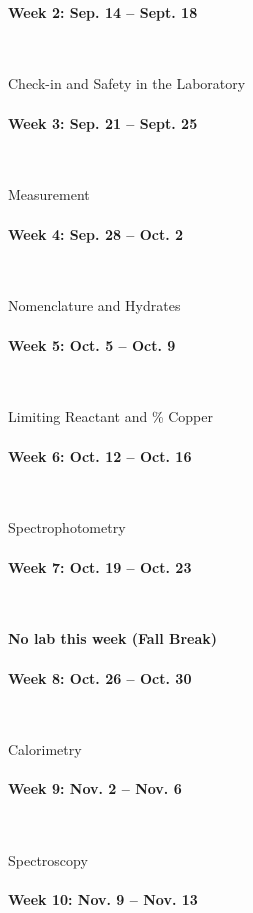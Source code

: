 \documentclass[12pt, letterpaper]{article}
\begin{document}
\paragraph{Week 2: Sep. 14 -- Sept. 18}~

Check-in and Safety in the Laboratory

\paragraph{Week 3: Sep. 21 -- Sept. 25}~

Measurement

\paragraph{Week 4: Sep. 28 -- Oct. 2}~

Nomenclature and Hydrates

\paragraph{Week 5: Oct. 5 -- Oct. 9}~

Limiting Reactant and \% Copper

\paragraph{Week 6: Oct. 12 -- Oct. 16}~

Spectrophotometry

\paragraph{Week 7: Oct. 19 -- Oct. 23}~

\textbf{No lab this week (Fall Break)}

\paragraph{Week 8: Oct. 26 -- Oct. 30}~

Calorimetry

\paragraph{Week 9: Nov. 2 -- Nov. 6}~

Spectroscopy

\paragraph{Week 10: Nov. 9 -- Nov. 13}~
\end{document}
